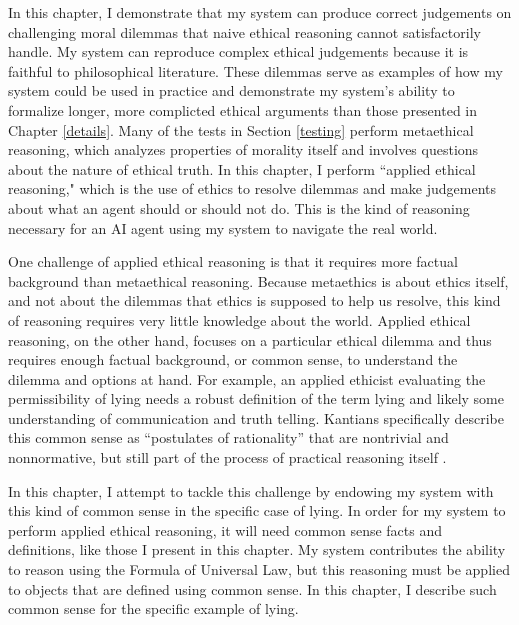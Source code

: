 %
\begin{isabellebody}%
%
%
\isadelimtheory
%
\endisadelimtheory
%
\isatagtheory
%
\endisatagtheory
{\isafoldtheory}%
%
\isadelimtheory
%
\endisadelimtheory
%
\isadelimdocument
%
\endisadelimdocument
%
\isatagdocument
%
\isamarkuptrue%
%
\endisatagdocument
{\isafolddocument}%
%
\isadelimdocument
%
\endisadelimdocument
%
\begin{isamarkuptext}%
In this chapter, I demonstrate that my system can produce correct judgements on challenging moral 
dilemmas that naive ethical reasoning cannot satisfactorily handle. My system can reproduce complex
ethical judgements because it is faithful to philosophical literature.
These dilemmas serve as examples of how my system could be used
in practice and demonstrate my system's ability to formalize longer, more complicted ethical arguments
than those presented in Chapter \ref{details}. 
Many of the tests in Section \ref{testing} perform metaethical reasoning, which analyzes properties
of morality itself and involves questions about the nature of ethical truth. In this chapter, I perform
``applied ethical reasoning," which is the use of ethics to resolve dilemmas and make judgements about 
what an agent should or should not do. This is the kind of reasoning necessary for an AI agent using my system to
navigate the real world.

One challenge of applied ethical reasoning is that it requires more factual background than metaethical
reasoning. Because metaethics is about ethics itself, and not about the dilemmas that ethics is 
supposed to help us resolve, this kind of reasoning requires very little knowledge about the world. 
Applied ethical reasoning, on the other hand,
focuses on a particular ethical dilemma and thus requires enough factual background, or common sense, 
to understand the dilemma and options at hand. For example, an applied ethicist 
evaluating the permissibility of lying needs a robust definition of the term lying and likely some
understanding of communication and truth telling. Kantians specifically describe
this common sense as ``postulates of rationality'' that are nontrivial and nonnormative, but still
part of the process of practical reasoning itself \citep{silber}. 

In this chapter, I attempt to tackle this challenge by
endowing my system with this kind of common sense in the specific case of lying. In order for my 
system to perform applied ethical reasoning, it will need common sense facts and definitions, like
those I present in this chapter. My system contributes the ability to reason
using the Formula of Universal Law, but this reasoning must be applied to objects that are defined
using common sense. In this chapter, I describe such common sense for the specific example
of lying.


\end{isamarkuptext}
\end{isabellebody}
